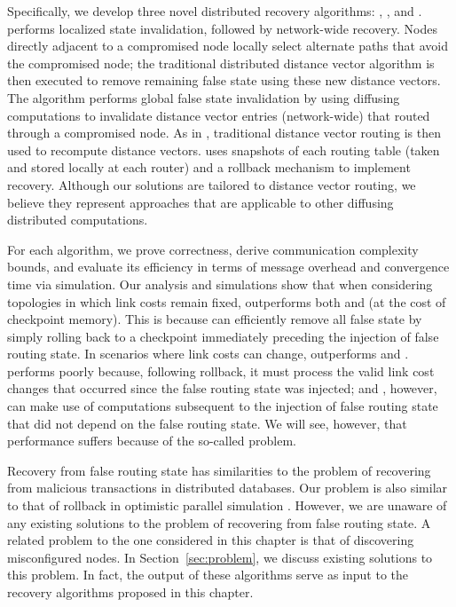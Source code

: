 Specifically, we develop three novel distributed recovery algorithms: \seconds, \purges, and \cprs. \second performs localized state invalidation, followed by network-wide recovery. 
Nodes directly adjacent to a compromised node locally select alternate paths that avoid the compromised node; the traditional distributed distance vector algorithm is then executed to 
remove remaining false state using these new distance vectors. The \purge algorithm performs global false state invalidation by using diffusing computations to invalidate distance vector 
entries (network-wide) that routed through a compromised node. As in \seconds, traditional distance vector routing is then used to recompute distance vectors. 
\cpr uses snapshots of each routing table (taken and stored locally at each router) and a rollback mechanism to implement recovery.
Although our solutions are tailored to distance vector routing, we believe they represent approaches that are applicable to other diffusing distributed computations. 

For each algorithm, we prove correctness, derive communication complexity bounds, and evaluate its efficiency in terms of message overhead and convergence time via simulation. 
Our analysis and simulations show that when considering topologies in which link costs remain fixed, \cpr outperforms both \purge and \second (at the cost of checkpoint memory). This is because \cpr can efficiently remove all false state by simply rolling back
to a checkpoint immediately preceding the injection of false routing state. In scenarios where link costs can change, \purge outperforms \cpr and \seconds. \cpr performs poorly because, following 
rollback, it must process the valid link cost changes that occurred since the false routing state was injected;  \second and \purges, however, can make use of computations subsequent to the 
injection of false routing state that did not depend on the false routing state. We will see, however, that \second performance suffers because of the so-called \infinity problem.


Recovery from false routing state has similarities to the problem of
recovering from malicious transactions \cite{Liu98, Liu00} in
distributed databases. Our problem is also similar to that of rollback
in optimistic parallel simulation \cite{Jeff}. However, we are unaware
of any existing solutions to the problem of recovering from false
routing state. A related problem to the one considered in this
chapter is that of discovering misconfigured nodes. In
Section~\ref{sec:problem}, we discuss existing solutions to this
problem. In fact, the output of these algorithms serve as input to the
recovery algorithms proposed in this chapter.

